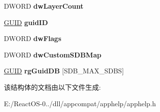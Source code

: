 \begin{DoxyCompactItemize}
D\+W\+O\+RD {\bfseries dw\+Layer\+Count}
\item 
\mbox{\label{structtag_s_d_b_q_u_e_r_y_r_e_s_u_l_t_a93ceae2f97ec2065d612fc07a0f7ea65}} 
\hyperlink{interface_g_u_i_d}{G\+U\+ID} {\bfseries guid\+ID}
\item 
\mbox{\label{structtag_s_d_b_q_u_e_r_y_r_e_s_u_l_t_a7014ee50e6d2236b9d7c9ca33f8b81d8}} 
D\+W\+O\+RD {\bfseries dw\+Flags}
\item 
\mbox{\label{structtag_s_d_b_q_u_e_r_y_r_e_s_u_l_t_a79e68a6a24d70f160fa0dc1d229ab76f}} 
D\+W\+O\+RD {\bfseries dw\+Custom\+S\+D\+B\+Map}
\item 
\mbox{\label{structtag_s_d_b_q_u_e_r_y_r_e_s_u_l_t_a34f2160ff391c50a06bd7c26d499ca82}} 
\hyperlink{interface_g_u_i_d}{G\+U\+ID} {\bfseries rg\+Guid\+DB} \mbox{[}S\+D\+B\+\_\+\+M\+A\+X\+\_\+\+S\+D\+BS\mbox{]}
\end{DoxyCompactItemize}


该结构体的文档由以下文件生成\+:\begin{DoxyCompactItemize}
\item 
E\+:/\+React\+O\+S-\/0../dll/appcompat/apphelp/apphelp.\+h\end{DoxyCompactItemize}
